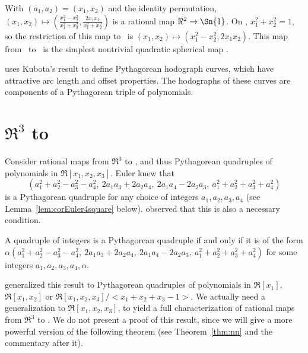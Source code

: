 \begin{example}
With $(a_1,a_2) = (x_1,x_2)$ and the identity permutation,
$(x_1,x_2) \mapsto (\frac{x_1^2 - x_2^2}{x_1^2 + x_2^2}, 
				 \frac{2x_1 x_2}{x_1^2 + x_2^2})$
is a rational map $\Re^2 \rightarrow \Sn{1}$.
On , $x_1^2 + x_2^2 = 1$, so the restriction of this map
to \ is $(x_1,x_2) \mapsto (x_1^2 - x_2^2, 2x_1x_2)$.
This map from \ to \ is
the simplest nontrivial quadratic spherical map \cite{ono94}. %
\end{example}

\begin{example}
\cite{farouki90} uses Kubota's result to define Pythagorean hodograph curves, 
which have attractive arc length and offset properties.
The hodographs of these curves are components of a Pythagorean triple
of polynomials.
\end{example}

\vspace{.5in}

\section{$\Re^{3}$ to }
\label{sec:n3}

Consider rational maps from $\Re^3$ to ,
and thus Pythagorean quadruples of polynomials in \linebreak $\Re[x_1,x_2,x_3]$.
Euler knew that 
\[ (a_1^2+a_2^2-a_3^2-a_4^2,\ 2a_1a_3+2a_2a_4,\ 2a_1a_4-2a_2a_3,
    \ a_1^2+a_2^2+a_3^2+a_4^2)
\]
is a Pythagorean quadruple for any choice of integers $a_1,a_2,a_3,a_4$
(see Lemma~\ref{lem:corEuler4square} below).
\linebreak
\cite{catalan85} observed that this is also a necessary condition.
%
\begin{lemma}[Catalan 1885]
\label{lem:catalan}
A quadruple of integers is a Pythagorean quadruple
if and only if it is of the form
$\alpha (a_1^2+a_2^2-a_3^2-a_4^2,\ 2a_1a_3+2a_2a_4,\ 2a_1a_4-2a_2a_3,
    \ a_1^2+a_2^2+a_3^2+a_4^2)$
for some integers $a_1,a_2,a_3,a_4,\alpha$.
\end{lemma}
\cite{dietz93} generalized this result to Pythagorean quadruples of
polynomials in $\Re[x_1]$, $\Re[x_1,x_2]$ or
$\Re[x_1,x_2,x_3]/<x_1+x_2+x_3-1>$.
We actually need a generalization to $\Re[x_1,x_2,x_3]$,
to yield a full characterization of rational maps from 
$\Re^3$ to .
We do not present a proof of this result, since we will give a more
powerful version of the following theorem (see Theorem~\ref{thm:nn} 
and the commentary after it).

